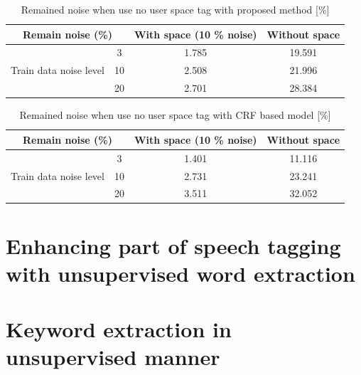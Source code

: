 \documentclass[11pt]{article}
\begin{document}
\begin{table}[H]
\centering
\label{tab:no_use_user_space_proposed}
\caption{Remained noise when use no user space tag with proposed method [\%]}
\begin{tabular}{|c|c|c|c|}
\hline
\multicolumn{2}{|c|}{Remain noise (\%)} & With space (10 \% noise) & Without space \\ \hline
\multirow{3}{*}{Train data noise level} & 3 & 1.785 & 19.591 \\ \cline{2-4} 
 & 10 & 2.508 & 21.996 \\ \cline{2-4} 
 & 20 & 2.701 & 28.384 \\ \hline
\end{tabular}
\end{table}

\begin{table}[H]
\centering
\label{tab:no_use_user_space_crf}
\caption{Remained noise when use no user space tag with CRF based model [\%]}
\begin{tabular}{|c|c|c|c|}
\hline
\multicolumn{2}{|c|}{Remain noise (\%)} & With space (10 \% noise) & Without space \\ \hline
\multirow{3}{*}{Train data noise level} & 3 & 1.401 & 11.116 \\ \cline{2-4} 
 & 10 & 2.731 & 23.241 \\ \cline{2-4} 
 & 20 & 3.511 & 32.052 \\ \hline
\end{tabular}
\end{table}


\section{Enhancing part of speech tagging with unsupervised word extraction}



\section{Keyword extraction in unsupervised manner}
\end{document}
